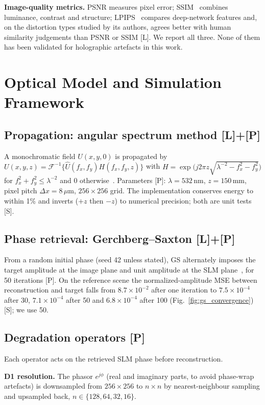 \documentclass[conference]{IEEEtran}
\begin{document}
\textbf{Image-quality metrics.} PSNR measures pixel error; SSIM~\cite{wang2004image}
combines luminance, contrast and structure; LPIPS~\cite{zhang2018unreasonable}
compares deep-network features and, on the distortion types studied by its
authors, agrees better with human similarity judgements than PSNR or SSIM
[L]. We report all three. None of them has been validated for holographic
artefacts in this work.

\section{Optical Model and Simulation Framework}
\label{sec:method}
\subsection{Propagation: angular spectrum method [L]+[P]}
A monochromatic field $U(x,y,0)$ is propagated by
$U(x,y,z)=\mathcal{F}^{-1}\{\hat U(f_x,f_y)H(f_x,f_y,z)\}$ with
$H=\exp\!\big(j2\pi z\sqrt{\lambda^{-2}-f_x^2-f_y^2}\big)$ for
$f_x^2+f_y^2\le\lambda^{-2}$ and $0$ otherwise~\cite{goodman2005introduction}.
Parameters [P]: $\lambda=532$\,nm, $z=150$\,mm, pixel pitch
$\Delta x=8\,\mu$m, $256\times256$ grid. The implementation conserves energy
to within 1\% and inverts ($+z$ then $-z$) to numerical precision; both are
unit tests [S].

\subsection{Phase retrieval: Gerchberg--Saxton [L]+[P]}
From a random initial phase (seed 42 unless stated), GS alternately imposes
the target amplitude at the image plane and unit amplitude at the SLM
plane~\cite{gerchberg1972practical}, for 50 iterations [P]. On the reference
scene the normalized-amplitude MSE between reconstruction and target falls
from $8.7\times10^{-2}$ after one iteration to $7.5\times10^{-4}$ after 30,
$7.1\times10^{-4}$ after 50 and $6.8\times10^{-4}$ after 100
(Fig.~\ref{fig:gs_convergence}) [S]; we use 50.

\subsection{Degradation operators [P]}
Each operator acts on the retrieved SLM phase before reconstruction.

\textbf{D1 resolution.} The phasor $e^{j\phi}$ (real and imaginary parts, to
avoid phase-wrap artefacts) is downsampled from $256\times256$ to $n\times n$
by nearest-neighbour sampling and upsampled back, $n\in\{128,64,32,16\}$.
\end{document}
